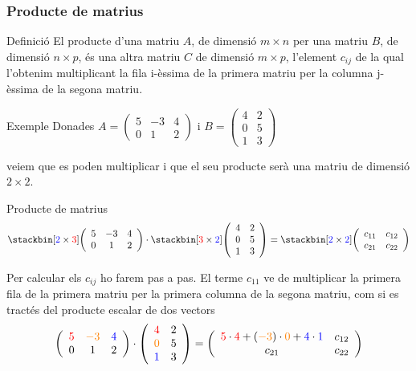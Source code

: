 \documentclass{beamer}
\begin{document}
\begin{frame}\frametitle{Producte de matrius}
\begin{block}{Definició}
El producte d'una matriu $A$, de dimensió $m\times n$ per una matriu $B$, de dimensió $n\times p$, és una altra matriu $C$ de dimensió $m\times p$, l'element $c_{ij}$ de la qual l'obtenim multiplicant la fila i-èssima de la primera matriu per la columna j-èssima de la segona matriu.
\end{block}
\begin{exampleblock}{Exemple}
Donades $A=\left(\begin{array}{ccc}
5 & -3 & 4\\
0 & 1 & 2\end{array}\right)$ i $B=\left(\begin{array}{cc}
4 & 2\\
0 & 5\\
1 & 3\end{array}\right)$

veiem que es poden multiplicar i que el seu producte serà una matriu de dimensió $2\times2$.
\end{exampleblock}
\end{frame}
\begin{frame}
\begin{exampleblock}{Producte de matrius}
 $$\stackbin[{\color{blue}2}\times{\color{red}3}]{}{\left(\begin{array}{ccc}
5 & -3 & 4\\
0 & 1 & 2\end{array}\right)}\cdot\stackbin[{\color{red}3}\times{\color{blue}2}]{}{\left(\begin{array}{cc}
4 & 2\\
0 & 5\\
1 & 3\end{array}\right)}=\stackbin[{\color{blue}2}\times{\color{blue}2}]{}{\left(\begin{array}{cc}
c_{11} & c_{12}\\
c_{21} & c_{22}\end{array}\right)}$$

Per calcular els $c_{ij}$ ho farem pas a pas. El terme $c_{11}$ ve de multiplicar la primera fila de la primera matriu per la primera columna de la segona matriu, com si es tractés
del producte escalar de dos vectors
$$\left(\begin{array}{ccc}
{\color{red}5} & {\color{orange}-3} & {\color{blue}4}\\
0 & 1 & 2\end{array}\right)\cdot\left(\begin{array}{cc}
{\color{red}4} & 2\\
{\color{orange}0} & 5\\
{\color{blue}1} & 3\end{array}\right)=\left(\begin{array}{cc}
{\color{red}5}\cdot{\color{red}4}+ ({\color{orange}-3})\cdot{\color{orange}0}+{\color{blue}4}\cdot{\color{blue}1}& c_{12}\\
c_{21} & c_{22}\end{array}\right)$$
\end{exampleblock}
\end{frame}
\end{document}
